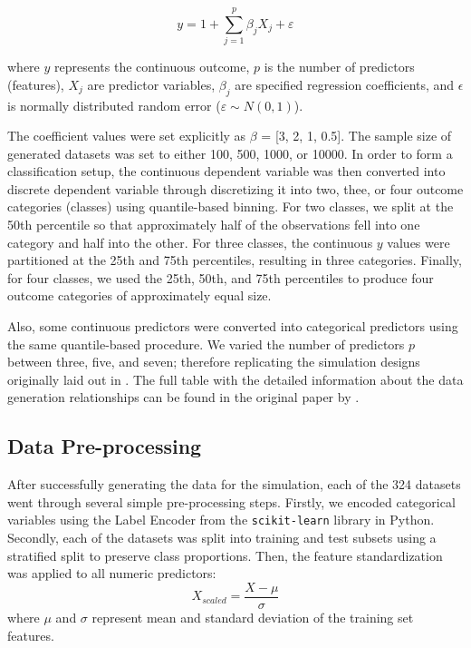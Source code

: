 \documentclass[12pt]{article}
\begin{document}
\begin{equation}
y = 1 + \sum_{j=1}^{p} \beta_j X_j + \varepsilon
\end{equation}

where $y$ represents the continuous outcome, $p$ is the number of predictors (features), $X_j$ are predictor variables, $\beta_j$ are specified regression coefficients, and $\epsilon$ is normally distributed random error ($\varepsilon \sim N(0,1)$).

The coefficient values were set explicitly as $\beta$ = [3, 2, 1, 0.5]. The sample size of generated datasets was set to either 100, 500, 1000, or 10000. In order to form a classification setup, the continuous dependent variable was then converted into discrete dependent variable through discretizing it into two, thee, or four outcome categories (classes) using quantile-based binning. For two classes, we split at the 50th percentile so that approximately half of the observations fell into one category and half into the other. For three classes, the continuous \(y\) values were partitioned at the 25th and 75th percentiles, resulting in three categories. Finally, for four classes, we used the 25th, 50th, and 75th percentiles to produce four outcome categories of approximately equal size. 

Also, some continuous predictors were converted into categorical predictors using the same quantile-based procedure. We varied the number of predictors \(p\) between three, five, and seven; therefore replicating the simulation designs originally laid out in \textcite{kim:10}. The full table with the detailed information about the data generation relationships can be found in the original paper by \textcite{kim:10}. 


\subsection{Data Pre-processing}

After successfully generating the data for the simulation, each of the 324 datasets went through several simple pre-processing steps. Firstly, we encoded categorical variables using the Label Encoder from the \texttt{scikit-learn} library in Python. Secondly, each of the datasets was split into training and test subsets using a stratified split to preserve class proportions. Then, the feature standardization was applied to all numeric predictors:
\[
X_{scaled} = \frac{X - \mu}{\sigma}
\]
where $\mu$ and $\sigma$ represent mean and standard deviation of the training set features.
\end{document}
